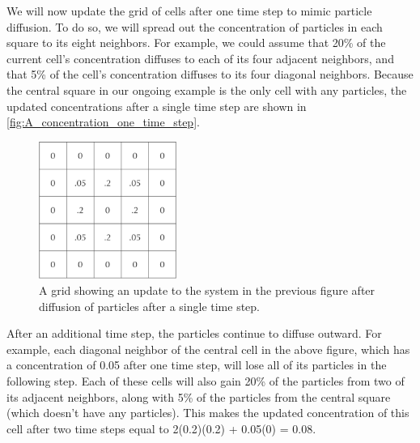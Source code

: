 We will now update the grid of cells after one time step to mimic particle diffusion. To do so, we will spread out the concentration of particles in each square to its eight neighbors. For example, we could assume that 20\% of the current cell's concentration diffuses to each of its four adjacent neighbors, and that 5\% of the cell's concentration diffuses to its four diagonal neighbors. Because the central square in our ongoing example is the only cell with any particles, the updated concentrations after a single time step are shown in \autoref{fig:A_concentration_one_time_step}.\\

\begin{figure}[h]
\centering
\mySfFamily
\includegraphics[width = 0.4\textwidth]{../images/A_concentration_one_time_step.png}
\caption{A grid showing an update to the system in the previous figure after diffusion of particles after a single time step.}
\label{fig:A_concentration_one_time_step}
\end{figure}

\begin{note}\end{note}

After an additional time step, the particles continue to diffuse outward. For example, each diagonal neighbor of the central cell in the above figure, which has a concentration of 0.05 after one time step, will lose all of its particles in the following step. Each of these cells will also gain 20\% of the particles from two of its adjacent neighbors, along with 5\% of the particles from the central square (which doesn't have any particles). This makes the updated concentration of this cell after two time steps equal to 2(0.2)(0.2) + 0.05(0) = 0.08.

